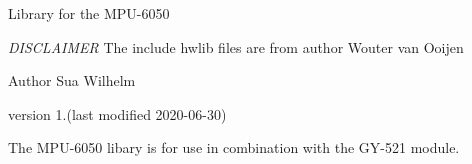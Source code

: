 Library for the M\+P\+U-\/6050

{\itshape D\+I\+S\+C\+L\+A\+I\+M\+ER} The include hwlib files are from author Wouter van Ooijen

Author Sua Wilhelm

version 1.(last modified 2020-\/06-\/30)

The M\+P\+U-\/6050 libary is for use in combination with the G\+Y-\/521 module. 